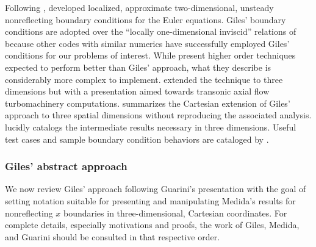 \documentclass[letterpaper,11pt,nointlimits,reqno,draft]{amsbook}
\begin{document}
Following \citet{Engquist1977Absorbing},
\citet{Giles1988Nonreflecting,Giles1990Nonreflecting} developed localized,
approximate two-dimensional, unsteady nonreflecting boundary conditions for the
Euler equations.  Giles' boundary conditions are adopted over the ``locally
one-dimensional inviscid'' relations of \citet{Poinsot1992Boundary} because
other codes with similar numerics have successfully employed Giles' conditions
for our problems of interest.  While \citet{Rowley2000Discretely} present
higher order techniques expected to perform better than Giles' approach, what
they describe is considerably more complex to implement.
\citet{Saxer1993QuasiThreeDimensional} extended the technique to three
dimensions but with a presentation aimed towards transonic axial flow
turbomachinery computations.  \citet{Guarini1998} summarizes the Cartesian
extension of Giles' approach to three spatial dimensions without reproducing
the associated analysis.  \citet{Medida2007} lucidly catalogs the intermediate
results necessary in three dimensions.  Useful test cases and sample boundary
condition behaviors are cataloged by \citet{Baum1995Accurate}.

\subsubsection{Giles' abstract approach}

We now review Giles' approach following Guarini's presentation with the goal of
setting notation suitable for presenting and manipulating Medida's results for
nonreflecting $x$ boundaries in three-dimensional, Cartesian coordinates.  For
complete details, especially motivations and proofs, the work of Giles, Medida,
and Guarini should be consulted in that respective order.
\end{document}
